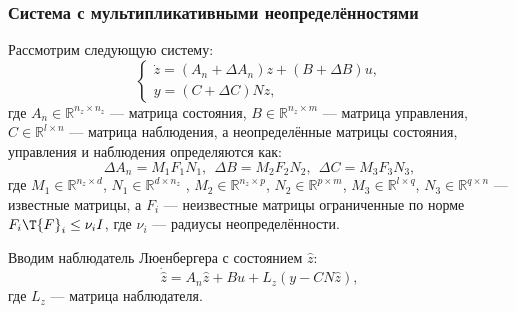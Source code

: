 \begin{frame}
    \frametitle{Система с мультипликативными неопределённостями}
    Рассмотрим следующую систему:
    \begin{equation}
    	\label{eq:part2_linear_dynamics}
    	\begin{cases}
    		\dot z=({A}_n+\Delta {A}_n)z + ({B}+\Delta {B})u,\\
    		y = ({C}+ \Delta {C}){N}  z,
    	\end{cases}
    \end{equation}
    где $A_n \in \mathbb{R}^{n_z \times n_z}$ --- матрица состояния, $B \in \mathbb{R}^{n_z \times m}$ --- матрица управления, $C \in \mathbb{R}^{l \times n}$ --- матрица наблюдения, а неопределённые матрицы состояния, управления и наблюдения определяются как:
    \begin{equation}
    	\label{eq:part2_uncertainty}
    	\Delta {A}_n={M}_1{F}_1{N}_1, \ \ \Delta {B}= {M}_2{F}_2{N}_2, \ \
    	\Delta {C} = {M}_3{F}_3{N}_3,
    \end{equation}
    где ${M}_1 \in \mathbb{R}^{n_z \times d}$, 
    ${N}_1 \in \mathbb{R}^{d \times n_z}$ , ${M}_2 \in \mathbb{R}^{n_z \times p}$,
    ${N}_2 \in \mathbb{R}^{p \times m}$, ${M}_3 \in \mathbb{R}^{l \times q}$,
    ${N}_3 \in \mathbb{R}^{q \times n}$ --- известные матрицы, 
    а ${F}_i$ --- неизвестные матрицы ограниченные по норме ${F}_i\T{F}_i\leq \nu_i {I}$, где $\nu_i$ --- радиусы неопределённости.
    
    Вводим наблюдатель Люенбергера с состоянием $\hat{z}$:
    \begin{equation}
    	\label{eq:Luenberger}
    	\dot{\hat{z}}={A}_n\hat{z}+{B}u+{L}_z(y- {C} {N}\hat{z}),
    \end{equation}
    где ${L}_z$ --- матрица наблюдателя. 
 
\end{frame}

